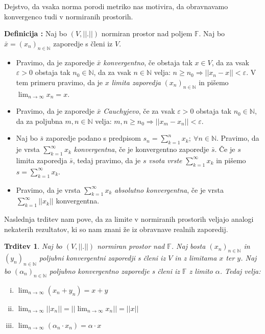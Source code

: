 \documentclass[a4paper, 10pt]{article}
\newtheorem{trditev}{Trditev}
\newcounter{defcount}
\newenvironment{definicija}{\begin{flushleft}\stepcounter{defcount}\textbf{Definicija \arabic{defcount}:}}{\hfill\end{flushleft}}
\newcommand{\abs}[1]{\ensuremath{\lvert #1 \rvert}}
\newcommand{\mth}[1]{\ensuremath{\mathbb{#1}}}
\newcommand{\N}{\mth{N}}
\newcommand{\F}{\mathbb{F}}
\newcommand{\pojem}[1]{\emph{#1}}
\newcommand{\norm}[1]{\abs{\abs{#1}}}
\begin{document}
		Dejstvo, da vsaka norma porodi metriko nas motivira, da obravnavamo konvergenco tudi v normiranih prostorih.
		\begin{definicija}
				\label{def:NormKonv}
				Naj bo $(V, \norm{.})$ normiran prostor nad poljem $\F$. Naj bo $\bar{x} = \left(x_n\right)_{n\in\N}$ zaporedje s členi iz $V$.
				\begin{itemize}
						\item Pravimo, da je zaporedje $\bar{x}$ \pojem{konvergentno}, če obstaja tak $x\in V$, da za vsak $\varepsilon > 0$ obstaja tak $n_0\in \N$, da za vsak $n\in \N$ velja: $n\geq n_0 \Rightarrow \norm{x_n - x} < \varepsilon$. V tem primeru pravimo, da je $x$ \pojem{limita zaporedja} $\left(x_n\right)_{n\in\N}$ in pišemo $\lim_{n\to\infty}x_n = x$.
						\item Pravimo, da je zaporedje $\bar{x}$ \pojem{Cauchyjevo}, če za vsak $\varepsilon >0$ obstaja tak $n_0\in\N$, da za poljubna $m, n \in \N$ velja: $m, n \geq n_0 \Rightarrow \norm{x_m - x_n} < \varepsilon$.
						\item Naj bo $\bar{s}$ zaporedje podano s predpisom $s_n = \sum_{k = 1}^{n}x_k;~\forall n\in\N$. Pravimo, da je vrsta $\sum_{k = 1}^{\infty}x_k$ \pojem{konvergentna}, če je konvergentno zaporedje $\bar{s}$. Če je $s$ limita zaporedja $\bar{s}$, tedaj pravimo, da je $s$ \pojem{vsota vrste} $\sum_{k = 1}^{\infty}x_k$ in pišemo $s = \sum_{k = 1}^{\infty}x_k$.
						\item Pravimo, da je vrsta $\sum_{k = 1}^{\infty}x_k$ \pojem{absolutno konvergentna}, če je vrsta $\sum_{k = 1}^{\infty}\norm{x_k}$ konvergentna.
					\end{itemize} 
			\end{definicija}
		Naslednja trditev nam pove, da za limite v normiranih prostorih veljajo analogi nekaterih rezultatov, ki so nam znani že iz obravnave realnih zaporedij.
		\begin{trditev}
				\label{trd:Normlim}
				Naj bo $(V, \norm{.})$ normiran prostor nad $\F$. Naj bosta $\left(x_n\right)_{n\in\N}$ in $\left(y_n\right)_{n\in\N}$ poljubni konvergentni zaporedji s členi iz $V$ in z limitama $x$ ter $y$. Naj bo $\left(\alpha_n\right)_{n\in\N}$ poljubno konvergentno zaporedje s členi iz $\F$ z limito $\alpha$. Tedaj velja: \begin{enumerate}[i)]
						\item $\lim_{n\to\infty}(x_n + y_n) = x + y$
						\item $\lim_{n\to\infty}\norm{x_n} = \norm{\lim_{n\to\infty}x_n}=\norm{x}$
						\item $\lim_{n\to\infty}(\alpha_n\cdot x_n) = \alpha\cdot x$
					\end{enumerate}
			\end{trditev}
		
\end{document}
